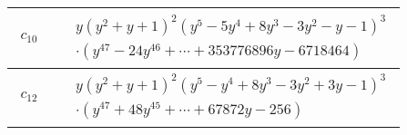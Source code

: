 \documentclass[1p]{elsarticle_modified}
\theoremstyle{definition}
\begin{document}
\begin{tabular}{m{50pt}|m{274pt}}
\hline $$\begin{aligned}c_{10}\end{aligned}$$&$\begin{aligned}
&y(y^2+y+1)^2(y^5-5 y^4+8 y^3-3 y^2- y-1)^3\\
&\cdot(y^{47}-24 y^{46}+\cdots+353776896 y-6718464)
\end{aligned}$\\
\hline $$\begin{aligned}c_{12}\end{aligned}$$&$\begin{aligned}
&y(y^2+y+1)^2(y^5- y^4+8 y^3-3 y^2+3 y-1)^3\\
&\cdot(y^{47}+48 y^{45}+\cdots+67872 y-256)
\end{aligned}$\\
\hline
\end{tabular}
\vskip 2pc
\end{document}

